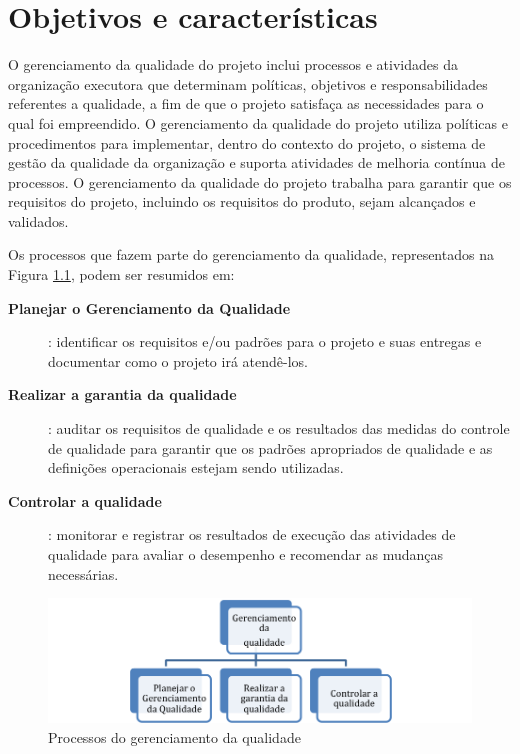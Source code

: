 \chapter{Objetivos e características}

O gerenciamento da qualidade do projeto inclui processos e atividades da organização executora que determinam políticas, objetivos e responsabilidades referentes a qualidade, a fim de que o projeto satisfaça as necessidades para o qual foi empreendido. O gerenciamento da qualidade do projeto utiliza políticas e procedimentos para implementar, dentro do contexto do projeto, o sistema de gestão da qualidade da organização e suporta atividades de melhoria contínua de processos. O gerenciamento da qualidade do projeto trabalha para garantir que os requisitos do projeto, incluindo os requisitos do produto, sejam alcançados e validados.

Os processos que fazem parte do gerenciamento da qualidade, representados na Figura \ref{fig:proc:ger:qualidade}, podem ser resumidos em:

\begin{description}
	
	\item[\textbf{Planejar o Gerenciamento da Qualidade}]: identificar os requisitos e/ou padrões para o projeto e suas entregas e documentar como o projeto irá atendê-los.
	
	\item[\textbf{Realizar a garantia da qualidade}]: auditar os requisitos de qualidade e os resultados das medidas do controle de qualidade para garantir que os padrões apropriados de qualidade e as definições operacionais estejam sendo utilizadas.
	
	\item[\textbf{Controlar a qualidade}]: monitorar e registrar os resultados de execução das atividades de qualidade para avaliar o desempenho e recomendar as mudanças necessárias.

\end{description}

\begin{figure}[!h]
	\centering
	\includegraphics[scale=0.75]{Figuras/gerenciamento_qualidade.png}
	\caption{Processos do gerenciamento da qualidade}
	\label{fig:proc:ger:qualidade}
\end{figure}


